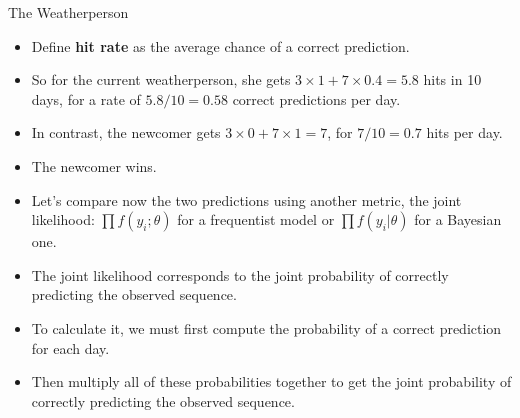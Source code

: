 \documentclass[handout]{beamer}
\begin{document}
\begin{frame}{The Weatherperson}
\scriptsize{

\begin{itemize}
\item Define \textbf{hit rate} as the average chance of a correct prediction.
\item So for the current weatherperson, she gets $3 \times 1 + 7 \times 0.4 = 5.8$ hits in 10 days, for a rate of $5.8/10 = 0.58$ correct predictions per day.
\item In contrast, the newcomer gets $3 \times 0 + 7 \times 1 = 7$, for $7/10 = 0.7$ hits per day. 
\item The newcomer wins.

\item Let's compare now the two predictions using another metric, the joint likelihood: $\prod f(y_i;\theta)$ for a frequentist model or $\prod f(y_i|\theta)$ for a Bayesian one.

\item The joint likelihood corresponds to the joint probability of correctly predicting the observed sequence.


\item To calculate it, we must first compute the probability of a correct prediction for each day.

\item Then multiply all of these probabilities together to get the joint probability of correctly predicting the observed sequence. 



\end{itemize}


} 
\end{frame}
\end{document}
